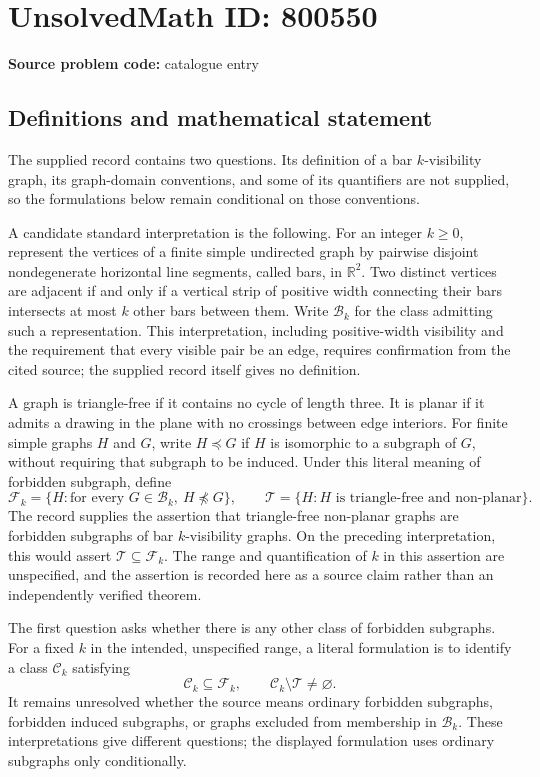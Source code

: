 \documentclass[11pt]{article}
\newcommand{\R}{\mathbb{R}}
\begin{document}
\section*{UnsolvedMath ID: 800550}
\textbf{Source problem code:} catalogue entry
\subsection{Definitions and mathematical statement}
The supplied record contains two questions. Its definition of a bar \(k\)-visibility graph, its graph-domain conventions, and some of its quantifiers are not supplied, so the formulations below remain conditional on those conventions.

A candidate standard interpretation is the following. For an integer \(k\geq 0\), represent the vertices of a finite simple undirected graph by pairwise disjoint nondegenerate horizontal line segments, called bars, in \(\R^2\). Two distinct vertices are adjacent if and only if a vertical strip of positive width connecting their bars intersects at most \(k\) other bars between them. Write \(\mathcal B_k\) for the class admitting such a representation. This interpretation, including positive-width visibility and the requirement that every visible pair be an edge, requires confirmation from the cited source; the supplied record itself gives no definition.

A graph is triangle-free if it contains no cycle of length three. It is planar if it admits a drawing in the plane with no crossings between edge interiors. For finite simple graphs \(H\) and \(G\), write \(H\preccurlyeq G\) if \(H\) is isomorphic to a subgraph of \(G\), without requiring that subgraph to be induced. Under this literal meaning of forbidden subgraph, define
\[
\mathcal F_k=\{H: \text{for every }G\in\mathcal B_k,\ H\not\preccurlyeq G\},
\qquad
\mathcal T=\{H:H\text{ is triangle-free and non-planar}\}.
\]
The record supplies the assertion that triangle-free non-planar graphs are forbidden subgraphs of bar \(k\)-visibility graphs. On the preceding interpretation, this would assert \(\mathcal T\subseteq\mathcal F_k\). The range and quantification of \(k\) in this assertion are unspecified, and the assertion is recorded here as a source claim rather than an independently verified theorem.

The first question asks whether there is any other class of forbidden subgraphs. For a fixed \(k\) in the intended, unspecified range, a literal formulation is to identify a class \(\mathcal C_k\) satisfying
\[
\mathcal C_k\subseteq\mathcal F_k,
\qquad
\mathcal C_k\setminus\mathcal T\ne\varnothing.
\]
It remains unresolved whether the source means ordinary forbidden subgraphs, forbidden induced subgraphs, or graphs excluded from membership in \(\mathcal B_k\). These interpretations give different questions; the displayed formulation uses ordinary subgraphs only conditionally.
\end{document}
